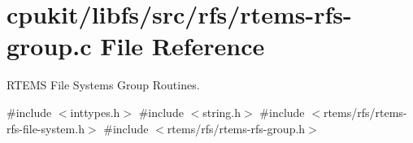 \hypertarget{rtems-rfs-group_8c}{}\section{cpukit/libfs/src/rfs/rtems-\/rfs-\/group.c File Reference}
\label{rtems-rfs-group_8c}


R\+T\+E\+MS File Systems Group Routines.  


{\ttfamily \#include $<$inttypes.\+h$>$}\newline
{\ttfamily \#include $<$string.\+h$>$}\newline
{\ttfamily \#include $<$rtems/rfs/rtems-\/rfs-\/file-\/system.\+h$>$}\newline
{\ttfamily \#include $<$rtems/rfs/rtems-\/rfs-\/group.\+h$>$}\newline
